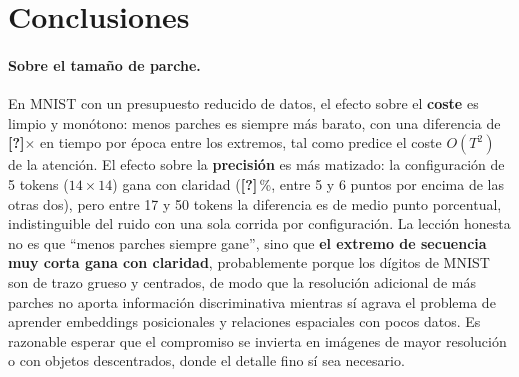 \documentclass[11pt,a4paper]{article}
\providecommand{\KpiBestAcc}{\textbf{[?]}}
\providecommand{\KpiEpochRatio}{\textbf{[?]}}
\begin{document}
\section{Conclusiones}
\label{sec:conclusiones}

\paragraph{Sobre el tamaño de parche.} En MNIST con un presupuesto reducido de
datos, el efecto sobre el \textbf{coste} es limpio y monótono: menos parches es
siempre más barato, con una diferencia de \KpiEpochRatio$\times$ en tiempo por
época entre los extremos, tal como predice el coste $O(T^2)$ de la atención. El
efecto sobre la \textbf{precisión} es más matizado: la configuración de 5 tokens
($14\times14$) gana con claridad (\KpiBestAcc\,\%, entre 5 y 6 puntos por encima
de las otras dos), pero entre 17 y 50 tokens la diferencia es de medio punto
porcentual, indistinguible del ruido con una sola corrida por configuración.
La lección honesta no es que ``menos parches siempre gane'', sino que \textbf{el
extremo de secuencia muy corta gana con claridad}, probablemente porque los
dígitos de MNIST son de trazo grueso y centrados, de modo que la resolución
adicional de más parches no aporta información discriminativa mientras sí agrava
el problema de aprender embeddings posicionales y relaciones espaciales con
pocos datos. Es razonable esperar que el compromiso se invierta en imágenes de
mayor resolución o con objetos descentrados, donde el detalle fino sí sea
necesario.
\end{document}
